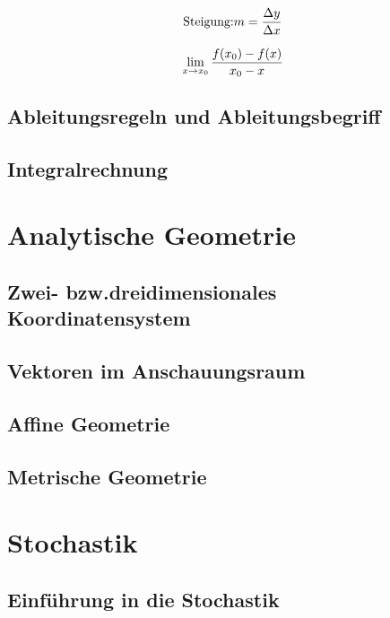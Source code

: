 \documentclass{article}
\begin{document}
        \begin{equation}
            \mbox{Steigung:} \vspace{10cm} m = {\frac {\Delta y} {\Delta x}}
        \end{equation}



        \begin{displaymath}
            \lim_{x \to x_{0}} {{f(x_{0}) - f(x)} \over { x_{0} - x}}
        \end{displaymath}



        \paragraph{}

        \subsection{Ableitungsregeln und Ableitungsbegriff}
        \subsection{Integralrechnung}

    \section{Analytische Geometrie}
        \subsection{Zwei- bzw.dreidimensionales Koordinatensystem}
        \subsection{Vektoren im Anschauungsraum}
        \subsection{Affine Geometrie}
        \subsection{Metrische Geometrie}

    \section{Stochastik}
        \subsection{Einführung in die Stochastik}
\end{document}
